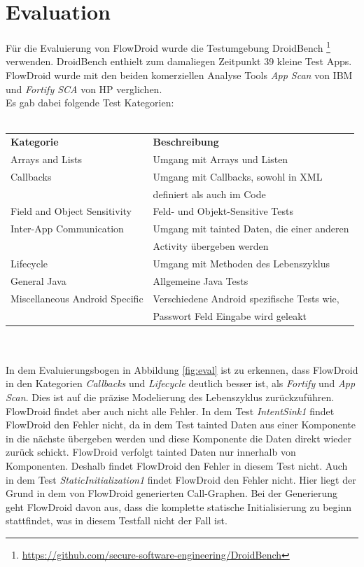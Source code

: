 \documentclass[runningheads]{llncs}
\begin{document}
\section{Evaluation}
Für die Evaluierung von FlowDroid wurde die Testumgebung DroidBench \footnote{\url{https://github.com/secure-software-engineering/DroidBench}} verwenden. DroidBench enthielt zum damaliegen Zeitpunkt 39 kleine Test Apps. FlowDroid wurde mit den beiden komerziellen Analyse Tools \emph{App Scan} von IBM und \emph{Fortify SCA} von HP verglichen. \\
Es gab dabei folgende Test Kategorien:\\\\
\begin{tabular}{ll}
	\textbf{Kategorie} 				& \textbf{Beschreibung}\\
	Arrays and Lists 				& Umgang mit Arrays und Listen\\
	Callbacks 						& Umgang mit Callbacks, sowohl in XML\\
			 						& definiert als auch im Code\\
	Field and Object Sensitivity 	& Feld- und Objekt-Sensitive Tests\\
	Inter-App Communication 		& Umgang mit tainted Daten, die einer anderen \\
									& Activity übergeben werden\\
	Lifecycle 						& Umgang mit Methoden des Lebenszyklus\\
	General Java 					& Allgemeine Java Tests\\
	Miscellaneous Android Specific 	& Verschiedene Android spezifische Tests wie, \\
									& Passwort Feld Eingabe wird geleakt\\
\end{tabular}\\\\
In dem Evaluierungsbogen in Abbildung \ref{fig:eval} ist zu erkennen, dass FlowDroid in den Kategorien \emph{Callbacks} und \emph{Lifecycle} deutlich besser ist, als \emph{Fortify} und \emph{App Scan}. Dies ist auf die präzise Modelierung des Lebenszyklus zurückzuführen. FlowDroid findet aber auch nicht alle Fehler. In dem Test \emph{IntentSink1} findet FlowDroid den Fehler nicht, da in dem Test tainted Daten aus einer Komponente in die nächste übergeben werden und diese Komponente die Daten direkt wieder zurück schickt. FlowDroid verfolgt tainted Daten nur innerhalb von Komponenten. Deshalb findet FlowDroid den Fehler in diesem Test nicht. Auch in dem Test \emph{StaticInitialization1} findet FlowDroid den Fehler nicht. Hier liegt der Grund in dem von FlowDroid generierten Call-Graphen. Bei der Generierung geht FlowDroid davon aus, dass die komplette statische Initialisierung zu beginn stattfindet, was in diesem Testfall nicht der Fall ist.\\
\end{document}
